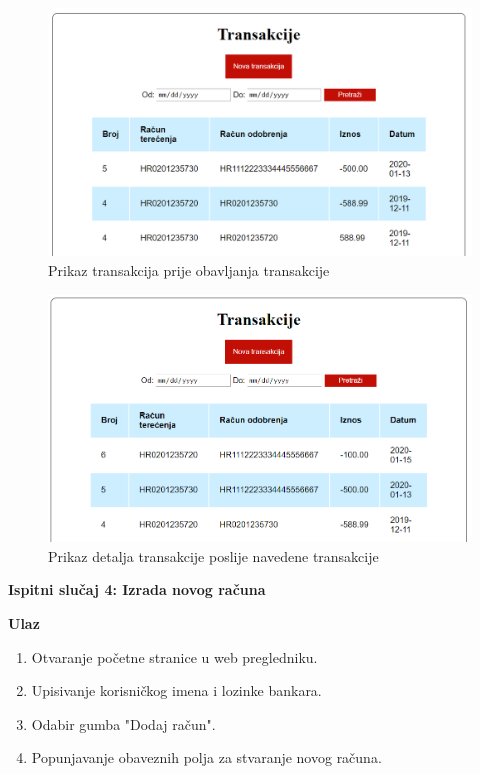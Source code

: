 	\begin{figure}[H]
		\includegraphics[scale=0.7]{slike/transakcijeprije.PNG}
		\centering
		\caption{Prikaz transakcija prije obavljanja transakcije}
		\label{fig:transprije}
	\end{figure}
	\begin{figure}[H]
		\includegraphics[scale=0.7]{slike/transakcijeposlije.PNG}
		\centering
		\caption{Prikaz detalja transakcije poslije navedene transakcije}
		\label{fig:transposlije}
	\end{figure}

	\textbf{Ispitni slučaj 4: Izrada novog računa} 
	
	\textbf{Ulaz}
	
	\begin{enumerate}
		
		\item Otvaranje početne stranice u web pregledniku.
		\item Upisivanje korisničkog imena i lozinke bankara.
		\item Odabir gumba "Dodaj račun".
		\item Popunjavanje obaveznih polja za stvaranje novog računa.
		
	\end{enumerate}
	
